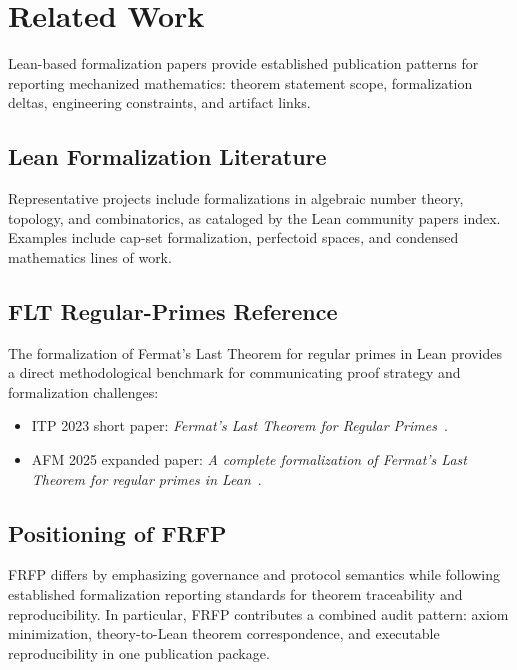 \section{Related Work}

Lean-based formalization papers provide established publication patterns for
reporting mechanized mathematics: theorem statement scope, formalization deltas,
engineering constraints, and artifact links.

\subsection{Lean Formalization Literature}

Representative projects include formalizations in algebraic number theory,
topology, and combinatorics, as cataloged by the Lean community papers index.
Examples include cap-set formalization, perfectoid spaces, and condensed
mathematics lines of work.

\subsection{FLT Regular-Primes Reference}

The formalization of Fermat's Last Theorem for regular primes in Lean provides a
direct methodological benchmark for communicating proof strategy and
formalization challenges:
\begin{itemize}
	\item ITP 2023 short paper: \emph{Fermat's Last Theorem for Regular Primes}~\cite{Dokchitser2023FLT}.
	\item AFM 2025 expanded paper: \emph{A complete formalization of Fermat's Last Theorem for regular primes in Lean}~\cite{vanDoorn2025FLT}.
\end{itemize}

\subsection{Positioning of FRFP}

FRFP differs by emphasizing governance and protocol semantics while following
established formalization reporting standards for theorem traceability and
reproducibility. In particular, FRFP contributes a combined audit pattern:
axiom minimization, theory-to-Lean theorem correspondence, and executable
reproducibility in one publication package.
